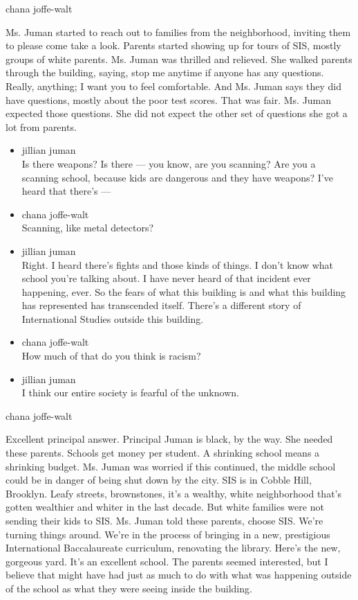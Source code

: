 chana joffe-walt

Ms. Juman started to reach out to families from the neighborhood,
inviting them to please come take a look. Parents started showing up for
tours of SIS, mostly groups of white parents. Ms. Juman was thrilled and
relieved. She walked parents through the building, saying, stop me
anytime if anyone has any questions. Really, anything; I want you to
feel comfortable. And Ms. Juman says they did have questions, mostly
about the poor test scores. That was fair. Ms. Juman expected those
questions. She did not expect the other set of questions she got a lot
from parents.

\begin{itemize}
\item
  jillian juman\\
  Is there weapons? Is there --- you know, are you scanning? Are you a
  scanning school, because kids are dangerous and they have weapons?
  I've heard that there's ---
\item
  chana joffe-walt\\
  Scanning, like metal detectors?
\item
  jillian juman\\
  Right. I heard there's fights and those kinds of things. I don't know
  what school you're talking about. I have never heard of that incident
  ever happening, ever. So the fears of what this building is and what
  this building has represented has transcended itself. There's a
  different story of International Studies outside this building.
\item
  chana joffe-walt\\
  How much of that do you think is racism?
\item
  jillian juman\\
  I think our entire society is fearful of the unknown.
\end{itemize}

chana joffe-walt

Excellent principal answer. Principal Juman is black, by the way. She
needed these parents. Schools get money per student. A shrinking school
means a shrinking budget. Ms. Juman was worried if this continued, the
middle school could be in danger of being shut down by the city. SIS is
in Cobble Hill, Brooklyn. Leafy streets, brownstones, it's a wealthy,
white neighborhood that's gotten wealthier and whiter in the last
decade. But white families were not sending their kids to SIS. Ms. Juman
told these parents, choose SIS. We're turning things around. We're in
the process of bringing in a new, prestigious International
Baccalaureate curriculum, renovating the library. Here's the new,
gorgeous yard. It's an excellent school. The parents seemed interested,
but I believe that might have had just as much to do with what was
happening outside of the school as what they were seeing inside the
building.

